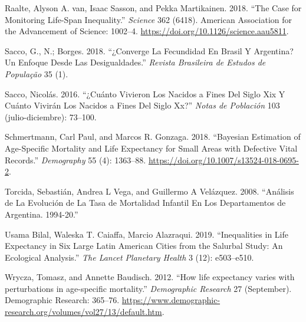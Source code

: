 \documentclass[12pt,]{article}
\begin{document}
\leavevmode\hypertarget{ref-van_Raalte1002}{}%
Raalte, Alyson A. van, Isaac Sasson, and Pekka Martikainen. 2018. ``The
Case for Monitoring Life-Span Inequality.'' \emph{Science} 362 (6418).
American Association for the Advancement of Science: 1002--4.
\url{https://doi.org/10.1126/science.aau5811}.

\leavevmode\hypertarget{ref-SaccoBorges2018}{}%
Sacco, G., N.; Borges. 2018. ``¿Converge La Fecundidad En Brasil Y
Argentina? Un Enfoque Desde Las Desigualdades.'' \emph{Revista
Brasileira de Estudos de População} 35 (1).

\leavevmode\hypertarget{ref-Sacco2016}{}%
Sacco, Nicolás. 2016. ``¿Cuánto Vivieron Los Nacidos a Fines Del Siglo
Xix Y Cuánto Vivirán Los Nacidos a Fines Del Siglo Xx?'' \emph{Notas de
Población} 103 (julio-diciembre): 73--100.

\leavevmode\hypertarget{ref-Schmertmann2018}{}%
Schmertmann, Carl Paul, and Marcos R. Gonzaga. 2018. ``Bayesian
Estimation of Age-Specific Mortality and Life Expectancy for Small Areas
with Defective Vital Records.'' \emph{Demography} 55 (4): 1363--88.
\url{https://doi.org/10.1007/s13524-018-0695-2}.

\leavevmode\hypertarget{ref-Torcida2008}{}%
Torcida, Sebastián, Andrea L Vega, and Guillermo A Velázquez. 2008.
``Análisis de La Evolución de La Tasa de Mortalidad Infantil En Los
Departamentos de Argentina. 1994-20.''

\leavevmode\hypertarget{ref-Bilal2019}{}%
Usama Bilal, Waleska T. Caiaffa, Marcio Alazraqui. 2019. ``Inequalities
in Life Expectancy in Six Large Latin American Cities from the Salurbal
Study: An Ecological Analysis.'' \emph{The Lancet Planetary Health} 3
(12): e503--e510.

\leavevmode\hypertarget{ref-Wrycza2012}{}%
Wrycza, Tomasz, and Annette Baudisch. 2012. ``How life expectancy varies
with perturbations in age-specific mortality.'' \emph{Demographic
Research} 27 (September). Demographic Research: 365--76.
\url{https://www.demographic-research.org/volumes/vol27/13/default.htm}.
\end{document}
